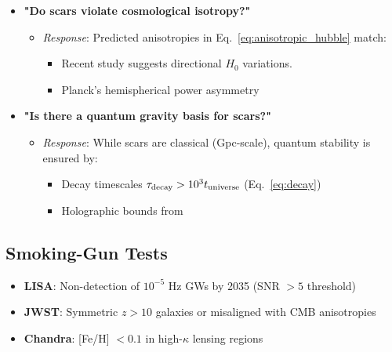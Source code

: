 \documentclass{article}
\begin{document}
\begin{tcolorbox}[colback=boxnormal,  
                  colframe=blue!50!black,  
                  title=\textbf{Topological Scars: Observational and Theoretical Challenges}]
\begin{itemize}
    \item \textbf{"Do scars violate cosmological isotropy?"}  
    \begin{itemize}  
        \item \textit{Response}: Predicted anisotropies in Eq.~\ref{eq:anisotropic_hubble} match:  
        \begin{itemize}  
            \item Recent study \cite{Szigeti} suggests directional $H_0$ variations.  
            \item Planck's hemispherical power asymmetry \cite{Planck2023}  
        \end{itemize}  
    \end{itemize}  

    \item \textbf{"Is there a quantum gravity basis for scars?"}  
    \begin{itemize}  
        \item \textit{Response}: While scars are classical (Gpc-scale), quantum stability is ensured by:  
        \begin{itemize}  
            \item Decay timescales $\tau_{\rm decay} > 10^3 t_{\rm universe}$ (Eq.~\ref{eq:decay})  
            \item Holographic bounds from \cite{Bousso2002}  
        \end{itemize}  
    \end{itemize}  

\end{itemize}  
\end{tcolorbox}  

\subsection{Smoking-Gun Tests}
\label{subsec:smokinggun}
  \begin{tcolorbox}[colback=boxnormal,
    colframe=blue!50!black,
    title=\textbf{Definitive Falsification Tests}
]
\begin{itemize}
    \item \textbf{LISA}: Non-detection of $10^{-5}$ Hz GWs by 2035 (SNR $> 5$ threshold)  
    \item \textbf{JWST}: Symmetric $z > 10$ galaxies or misaligned with CMB anisotropies  
    \item \textbf{Chandra}: [Fe/H] $< 0.1$ in high-$\kappa$ lensing regions  
\end{itemize}
\end{tcolorbox}
\end{document}
